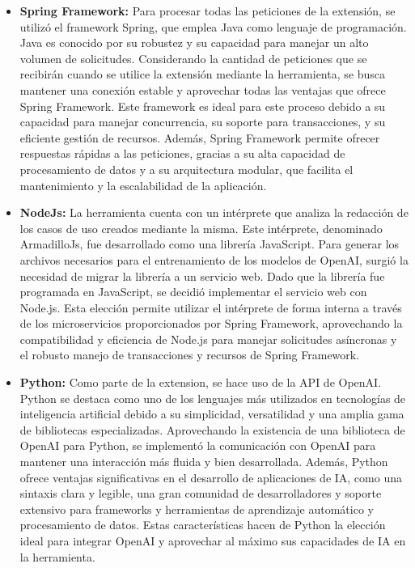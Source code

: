\begin{itemize}
	\item \textbf{Spring Framework:} Para procesar todas las peticiones de la extensión, se utilizó el framework Spring, que emplea Java como lenguaje de programación. Java es conocido por su robustez y su capacidad para manejar un alto volumen de solicitudes. Considerando la cantidad de peticiones que se recibirán cuando se utilice la extensión mediante la herramienta, se busca mantener una conexión estable y aprovechar todas las ventajas que ofrece Spring Framework. Este framework es ideal para este proceso debido a su capacidad para manejar concurrencia, su soporte para transacciones, y su eficiente gestión de recursos. Además, Spring Framework permite ofrecer respuestas rápidas a las peticiones, gracias a su alta capacidad de procesamiento de datos y a su arquitectura modular, que facilita el mantenimiento y la escalabilidad de la aplicación.
	
	\item \textbf{NodeJs:} La herramienta cuenta con un intérprete que analiza la redacción de los casos de uso creados mediante la misma. Este intérprete, denominado ArmadilloJs, fue desarrollado como una librería JavaScript. Para generar los archivos necesarios para el entrenamiento de los modelos de OpenAI, surgió la necesidad de migrar la librería a un servicio web. Dado que la librería fue programada en JavaScript, se decidió implementar el servicio web con Node.js. Esta elección permite utilizar el intérprete de forma interna a través de los microservicios proporcionados por Spring Framework, aprovechando la compatibilidad y eficiencia de Node.js para manejar solicitudes asíncronas y el robusto manejo de transacciones y recursos de Spring Framework.
	
	\item \textbf{Python:} Como parte de la extension, se hace uso de la API de OpenAI. Python se destaca como uno de los lenguajes más utilizados en tecnologías de inteligencia artificial debido a su simplicidad, versatilidad y una amplia gama de bibliotecas especializadas. Aprovechando la existencia de una biblioteca de OpenAI para Python, se implementó la comunicación con OpenAI para mantener una interacción más fluida y bien desarrollada. Además, Python ofrece ventajas significativas en el desarrollo de aplicaciones de IA, como una sintaxis clara y legible, una gran comunidad de desarrolladores y soporte extensivo para frameworks y herramientas de aprendizaje automático y procesamiento de datos. Estas características hacen de Python la elección ideal para integrar OpenAI y aprovechar al máximo sus capacidades de IA en la herramienta.
	
\end{itemize}

